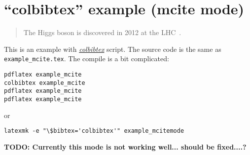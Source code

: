 \documentclass{article}
\newcommand\TODO[1]{{\color{red} \textbf{TODO: #1}}}
\begin{document}
\section*{``colbibtex'' example (mcite mode)}
\begin{quote}
The Higgs boson is discovered in 2012 at the LHC~\cite{Aad:2012tfa,*Chatrchyan:2012xdj}.
\end{quote}

This is an example with \href{https://github.com/misho104/colbibtex}{\emph{colbibtex}} script.
The source code is the same as \texttt{example\_mcite.tex}.
The compile is a bit complicated:
\begin{lstlisting}
pdflatex example_mcite
colbibtex example_mcite
pdflatex example_mcite
pdflatex example_mcite
\end{lstlisting}
or
\begin{lstlisting}
latexmk -e "\$bibtex='colbibtex'" example_mcitemode
\end{lstlisting}

\TODO{Currently this mode is not working well... should be fixed....?}


\end{document}
